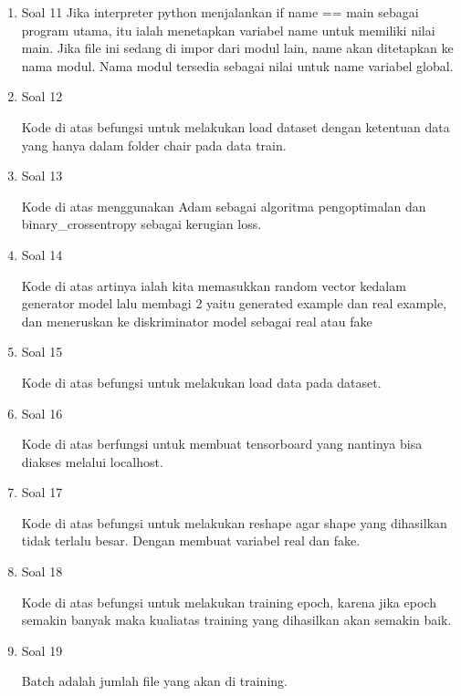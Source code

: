 \begin{enumerate}
	\item Soal 11
	\hfill\break
	Jika interpreter python menjalankan if name == main sebagai program utama, itu ialah menetapkan variabel name untuk memiliki nilai main. Jika file ini sedang di impor dari modul lain, name akan ditetapkan ke nama modul. Nama modul tersedia sebagai nilai untuk name variabel global.

	\item Soal 12
	\hfill\break
	
	Kode di atas befungsi untuk melakukan load dataset dengan ketentuan data yang hanya dalam folder chair pada data train.

	\item Soal 13
	\hfill\break
	
	Kode di atas menggunakan Adam sebagai algoritma pengoptimalan dan binary\_crossentropy sebagai kerugian loss. 

	\item Soal 14
	\hfill\break
	
	Kode di atas artinya ialah kita memasukkan random vector kedalam generator model lalu membagi 2 yaitu generated example dan real example, dan meneruskan ke diskriminator model sebagai real atau fake

	\item Soal 15
	\hfill\break
	
	Kode di atas befungsi untuk melakukan load data pada dataset.

	\item Soal 16
	\hfill\break
	
	Kode di atas berfungsi untuk membuat tensorboard yang nantinya bisa diakses melalui localhost.

	\item Soal 17
	\hfill\break
	
	Kode di atas befungsi untuk melakukan reshape agar shape yang dihasilkan tidak terlalu besar. Dengan membuat variabel real dan fake.

	\item Soal 18
	\hfill\break
	
	Kode di atas befungsi untuk melakukan training epoch, karena jika epoch semakin banyak maka kualiatas training yang dihasilkan akan semakin baik.

	\item Soal 19
	\hfill\break
	
	Batch adalah jumlah file yang akan di training.


\end{enumerate}
